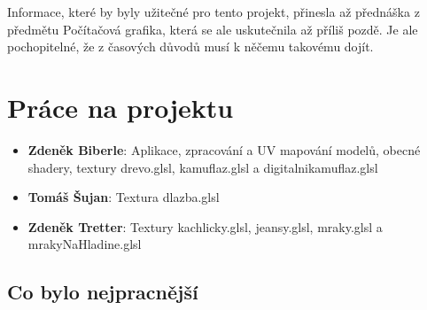 \documentclass[12pt,a4paper,titlepage,final]{report}
\newcommand\AuthorA{Zdeněk Biberle}
\newcommand\AuthorB{Tomáš Šujan}
\newcommand\AuthorC{Zdeněk Tretter}
\begin{document}
Informace, které by byly užitečné pro tento projekt, přinesla až přednáška z předmětu Počítačová grafika, která se ale uskutečnila až příliš pozdě. Je ale pochopitelné, že z časových důvodů musí k něčemu takovému dojít.

\chapter{Práce na projektu}

\begin{itemize}
\item \textbf{\AuthorA}: Aplikace, zpracování a UV mapování modelů, obecné shadery, textury drevo.glsl, kamuflaz.glsl a digitalnikamuflaz.glsl
\item \textbf{\AuthorB}: Textura dlazba.glsl
\item \textbf{\AuthorC}: Textury kachlicky.glsl, jeansy.glsl, mraky.glsl a mrakyNaHladine.glsl
\end{itemize}

\section{Co bylo nejpracnější}
\end{document}

